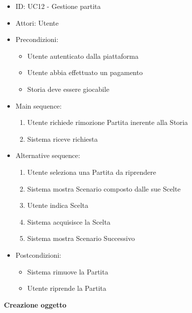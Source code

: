 \documentclass{article}
\begin{document}
\begin{itemize}[label = { }]
    \itemsep0px
    \item ID: UC12 - Gestione partita
    \item Attori: Utente
    \item Precondizioni: 
        \begin{itemize}[label = {-}]
            \item Utente autenticato dalla piattaforma
            \item Utente abbia effettuato un pagamento
            \item Storia deve essere giocabile
        \end{itemize}
    \item Main sequence: 
        \begin{enumerate}
            \item Utente richiede rimozione Partita inerente alla Storia
            \item Sistema riceve richiesta
        \end{enumerate}
    \item Alternative sequence:
        \begin{enumerate}
            \item Utente seleziona una Partita da riprendere
            \item Sistema mostra Scenario composto dalle sue Scelte
            \item Utente indica Scelta
            \item Sistema acquisisce la Scelta
            \item Sistema mostra Scenario Successivo
        \end{enumerate}
    \item Postcondizioni: 
        \begin{itemize}[label = {-}]
            \item Sistema rimuove la Partita
            \item Utente riprende la Partita
        \end{itemize}
\end{itemize}
\textbf{Creazione oggetto}
\end{document}
